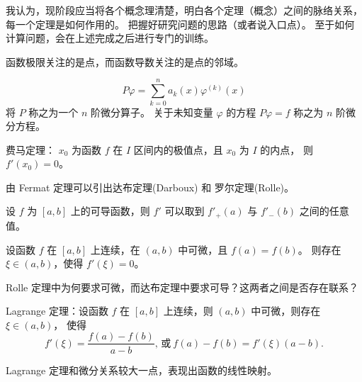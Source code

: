 \begin{note}
    我认为，现阶段应当将各个概念理清楚，明白各个定理（概念）之间的脉络关系，每一个定理是如何作用的。
    把握好研究问题的思路（或者说入口点）。
    至于如何计算问题，会在上述完成之后进行专门的训练。
\end{note}

\begin{note}
    函数极限关注的是点，而函数导数关注的是点的邻域。
\end{note}

\begin{note}[微分算子]
    \begin{equation*}
        P\varphi = \sum_{k=0}^{n}{a_k(x)\varphi^{(k)}{(x)}}
    \end{equation*}
    将 $P$ 称之为一个 $n$ 阶微分算子。
    关于未知变量 $\varphi$ 的方程 $P\varphi = f$ 称之为 $n$ 阶微分方程。
\end{note}

\begin{note}[Fermat 定理]
    费马定理：
    $x_0$ 为函数 $f$ 在 $I$ 区间内的极值点，且 $x_0$ 为 $I$ 的内点，
    则 $f'(x_0) = 0$。
    
    由 Fermat 定理可以引出达布定理(Darboux) 和 罗尔定理(Rolle)。
\end{note}

\begin{note}[Darboux 定理]
    设 $f$ 为 $[a, b]$ 上的可导函数，则 $f'$ 可以取到 $f'_{+}(a)$ 与 $f'_{-}(b)$
    之间的任意值。
\end{note}

\begin{note}[Rolle 定理]
    设函数 $f$ 在 $[a, b]$ 上连续，在 $(a,b)$ 中可微，且 $f(a) = f(b)$。
    则存在 $\xi \in (a,b)$，使得 $f'(\xi) = 0$。
\end{note}

\begin{note}
    Rolle 定理中为何要求可微，而达布定理中要求可导？这两者之间是否存在联系？
\end{note}

\begin{note}[Lagrange]
    Lagrange 定理：设函数 $f$ 在 $[a, b]$ 上连续，则 $(a, b)$ 中可微，则存在 $\xi \in (a, b)$，
    使得
    \begin{equation*}
        f'(\xi) = \frac{f(a) - f(b)}{a - b} \text{, 或}\ f(a) - f(b) = f'(\xi)(a-b).
    \end{equation*}

    Lagrange 定理和微分关系较大一点，表现出函数的线性映射。
\end{note}

